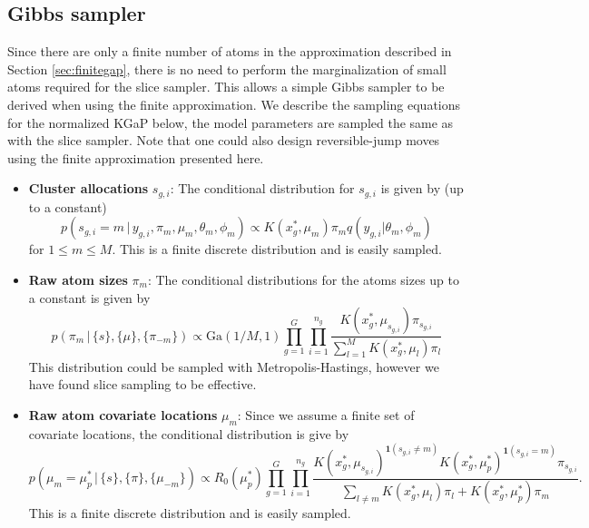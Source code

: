 \documentclass{article} %
\newcommand{\Ga}{\text{Ga}}
\newcommand{\idf}[1]{\mathbf 1 \left ( #1 \right )}
\begin{document}
\subsection{Gibbs sampler}

Since there are only a finite number of atoms in the approximation described in
Section \ref{sec:finitegap}, there is no need to perform the marginalization of
small atoms required for the slice sampler.  This allows a simple Gibbs sampler
to be derived when using the finite approximation.  We describe the sampling
equations for the normalized KGaP below, the model parameters are sampled the
same as with the slice sampler.  Note that one 
could also design reversible-jump moves \cite{Green:Hastie:2009} using the finite 
approximation presented here.

\begin{itemize}
  \item \textbf{Cluster allocations} $s_{g,i}$: The conditional distribution
    for $s_{g,i}$ is given by (up to a constant)
    \begin{equation}
      p(s_{g,i} = m \, | \, y_{g,i}, \pi_m, \mu_m, \theta_m, \phi_m) \propto
      K(x^*_g,\mu_m)\pi_m q(y_{g,i}|\theta_m,\phi_m)
    \end{equation}
    for $1 \leq m \leq M$.  This is a finite discrete distribution and is easily 
    sampled.

  \item \textbf{Raw atom sizes} $\pi_m$: The conditional distributions for the atoms sizes 
    up to a constant is given by
    \begin{equation}
      p(\pi_m \, | \, \{s\}, \{\mu\}, \{\pi_{-m}\}) \propto \Ga(1/M,1)\prod_{g=1}^G\prod_{i=1}^{n_g} 
      \frac{ K(x^*_g,\mu_{s_{g,i}})\pi_{s_{g,i}} }{ \sum_{l=1}^M
      K(x^*_g,\mu_l)\pi_l}
    \end{equation}
    This distribution could be sampled with Metropolis-Hastings, however we
    have found slice sampling \cite{DamlenWakefieldWalker:1999} to be effective.
    
  \item \textbf{Raw atom covariate locations} $\mu_m$: Since we assume a finite
    set of covariate locations, the conditional distribution is give by
    \begin{equation}
      p(\mu_m = \mu^*_p \, | \, \{s\}, \{\pi\}, \{\mu_{-m}\}) \propto R_0(\mu^*_p)
      \prod_{g=1}^G \prod_{i=1}^{n_g} \frac{
      K(x^*_g,\mu_{s_{g,i}})^{\idf{s_{g,i}\neq m}}
      K(x^*_g,\mu^*_p)^{\idf{s_{g,i}=m}} \pi_{s_{g,i}} }
      { \sum_{l \neq m}K(x^*_g,\mu_l)\pi_l + K(x^*_g, \mu^*_p)\pi_m }.
    \end{equation}
    This is a finite discrete distribution and is easily sampled.

\end{itemize}
\end{document}
